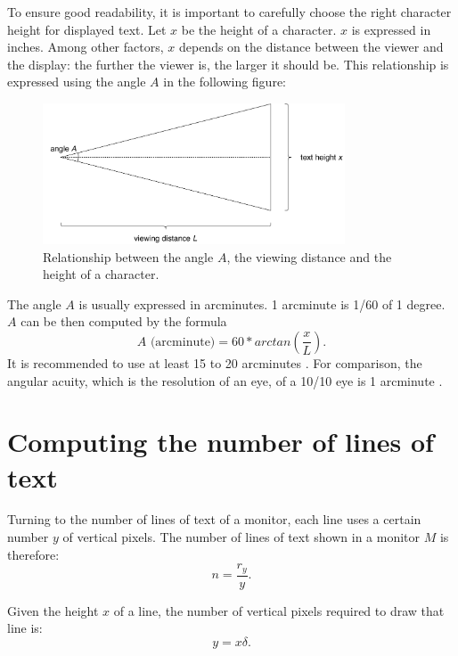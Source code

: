 \documentclass{article}
\begin{document}
To ensure good readability, it is important to carefully choose the right character height for displayed text. Let $x$ be the height of a character. $x$ is expressed in inches. Among other factors, $x$ depends on the distance between the viewer and the display: the further the viewer is, the larger it should be. This relationship is expressed using the angle $A$ in the following figure:

\begin{figure}[!h]
   \centering
   \includegraphics[page=1,width=0.8\textwidth]{angle.pdf}
 \caption{Relationship between the angle $A$, the viewing distance and the height of a character.}
 \label{fig:arch}
\end{figure}

The angle $A$ is usually expressed in arcminutes. 1 arcminute is 1/60 of 1 degree. $A$ can be then computed by the formula
\begin{equation}
A \text{ (arcminute)} = 60 * arctan \left( \frac{x}{L} \right).
\end{equation}
It is recommended to use at least 15 to 20 arcminutes \cite{extron}. For comparison, the angular acuity, which is the resolution of an eye, of a 10/10 eye is 1 arcminute \cite{wiki-va}.

\section{Computing the number of lines of text}
Turning to the number of lines of text of a monitor, each line uses a certain number $y$ of vertical pixels. The number of lines of text shown in a monitor $M$ is therefore:
\begin{equation} \label{n}
n = \frac{r_y}{y}.
\end{equation}

Given the height $x$ of a line, the number of vertical pixels required to draw that line is:
\begin{equation} \label{y}
y = x \delta.
\end{equation}
\end{document}
